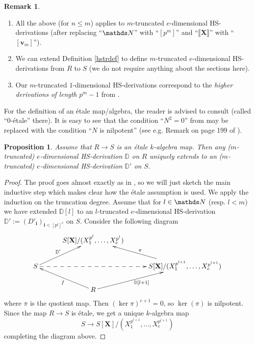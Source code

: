 \documentclass[10pt]{amsart}
\newtheorem{prop}[theorem]{Proposition}
\theoremstyle{definition}
\newtheorem{remark}[theorem]{Remark}
\begin{document}
\begin{remark}
\begin{enumerate}
\item All the above (for $n\leqslant m$) applies to $m$-truncated $e$-dimensional HS-derivations (after replacing ``$\Nn$'' with ``$[p^m]$'' and ``$\llbracket \mathbf{X}\rrbracket$'' with ``$[\mathbf{v}_m]$'').

\item We can extend Definition \ref{hstrdef} to define $m$-truncated $e$-dimensional HS-derivations from $R$ to $S$ (we do not require anything about the sections here).

\item Our $m$-truncated $1$-dimensional HS-derivations correspond to the \emph{higher derivations of length $p^m-1$} from \cite{mat}.

\end{enumerate}
\end{remark}
\noindent
For the definition of an \'{e}tale map/algebra, the reader is advised to consult \cite[p. 193]{mat} (called ``0-\'{e}tale'' there). It is easy to see that the condition ``$N^2=0$'' from \cite[p. 193]{mat} may be replaced with the condition ``$N$ is nilpotent'' (see e.g. Remark on page 199 of \cite{mat0}).
\begin{prop}\label{etalehs}
 Assume that $R\to S$ is  an \'{e}tale $k$-algebra map. Then any ($m$-truncated) $e$-dimensional HS-derivation $\mathbb{D}$ on $R$ uniquely extends to an ($m$-truncated) $e$-dimensional HS-derivation $\mathbb{D}'$ on $S$.
\end{prop}
\begin{proof}
The proof goes almost exactly as in \cite[theorem 27.2]{mat}, so we will just sketch the main inductive step which makes clear how the \'{e}tale assumption is used. We apply the induction on the truncation degree. Assume that for $l\in \Nn$ (resp. $l<m$) we have extended $\mathbb{D}[l]$ to an $l$-truncated $e$-dimensional HS-derivation $\mathbb{D}':=(D'_{\mathbf{i}})_{\mathbf{i}<[p^l]^e}$ on $S$. Consider the following diagram
\begin{equation*}
 \xymatrixcolsep{2.5pc}\xymatrixrowsep{1.5pc}\xymatrix{& S[\mathbf{X}]/(X_1^{p^l},\ldots,X_e^{p^l}) &
\\ S  \ar[ur]^-{\mathbb{D}'} \ar@{-->}[rr]
 &  & S[\mathbf{X}]/(X_1^{p^{l+1}},\ldots,X_e^{p^{l+1}})  \ar[ul]_{\pi}
\\ & R \ar[ul]^{f} \ar[ur]_{\mathbb{D}[l+1]} &
}
\end{equation*}
where $\pi$ is the quotient map. Then $(\ker \pi)^{e+1}=0$, so $\ker(\pi)$ is nilpotent. Since the map $R\to S$ is \'{e}tale, we get a unique $k$-algebra map
$$S\to S[\mathbf{X}]/(X_1^{p^{l+1}},\ldots,X_e^{p^{l+1}})$$
completing the diagram above.
\end{proof}
\end{document}
